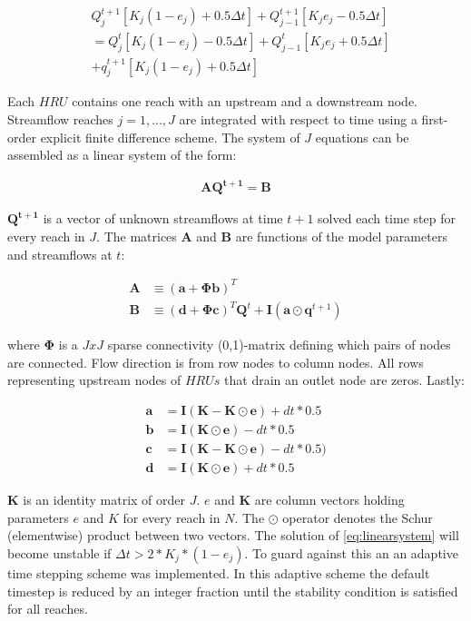 \begin{align}
&Q_j^{t+1}\left[K_j(1 - e_j) + 0.5\Delta t  \right] + Q_{j-1}^{t+1}\left[K_je_j - 0.5\Delta t  \right]  \\
&= Q_j^{t}\left[K_j(1 - e_j) - 0.5\Delta t  \right] + Q_{j-1}^{t}\left[K_je_j + 0.5\Delta t  \right]\\
&+ q_{j}^{t+1}\left[K_j(1 - e_j) + 0.5\Delta t  \right]
\end{align}

Each $HRU$ contains one reach with an upstream and a downstream node. Streamflow reaches $j=1,...,J$ are integrated with respect to time using a first-order explicit finite difference scheme. The system of $J$ equations can be assembled as a linear system of the form:   

\begin{align}\label{eq:linearsystem}
\mathbf{A}\mathbf{Q^{t+1}} = \mathbf{B}
\end{align}

$\mathbf{Q^{t+1}}$ is a vector of unknown streamflows at time $t+1$ solved each time step for every reach in $J$. The matrices $\mathbf{A}$ and $\mathbf{B}$ are functions of the model parameters and streamflows at $t$:

\begin{align}
\mathbf{A}&\equiv (\mathbf{a} + \mathbf{\Phi} \mathbf{b})^T\\
\mathbf{B}&\equiv (\mathbf{d} + \mathbf{\Phi}\mathbf{c})^T\mathbf{Q}^t + \mathbf{I}(\mathbf{a\odot q}^{t+1})
\end{align}

where $\mathbf{\Phi}$ is a $JxJ$ sparse connectivity (0,1)-matrix defining which pairs of nodes are connected. Flow direction is from row nodes to column nodes. All rows representing upstream nodes of $HRUs$ that drain an outlet node are zeros. Lastly:

\begin{align}
\mathbf{a} &= \mathbf{I} (\mathbf{K}-\mathbf{K\odot e}) + dt * 0.5\\
\mathbf{b} &= \mathbf{I} (\mathbf{K\odot e}) - dt * 0.5\\
\mathbf{c} &= \mathbf{I} (\mathbf{K}-\mathbf{K\odot e}) - dt * 0.5)\\
\mathbf{d} &= \mathbf{I} (\mathbf{K\odot e}) + dt * 0.5
\end{align}


$\mathbf{K}$ is an identity matrix of order $J$. $e$ and $\mathbf{K}$ are column vectors holding parameters $e$ and $K$ for every reach in $N$. The $\odot$ operator denotes the Schur (elementwise) product between two vectors. The solution of \eqref{eq:linearsystem} will become unstable if $\Delta t > 2 * K_j * (1 - e_j)$. To guard against this an an adaptive time stepping scheme was implemented. In this adaptive scheme the default timestep is reduced by an integer fraction until the stability condition is satisfied for all reaches.



